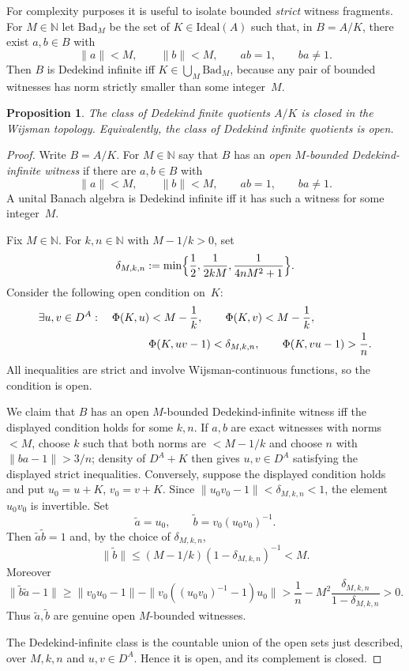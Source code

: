 \documentclass[12pt,fleqn,a4paper]{amsart}
\renewcommand{\le}{\leqslant}
\renewcommand{\ge}{\geqslant}
\numberwithin{equation}{section}
\newtheorem{proposition}[theorem]{Proposition}
\theoremstyle{definition}
\newcommand{\N}{\mathbb{N}}
\newcommand{\Ideal}{\mathrm{Ideal}}
\begin{document}
For complexity purposes it is useful to isolate bounded
\textit{strict} witness fragments.  For $M\in\N$ let $\mathrm{Bad}_M$ be the set of
$K\in\Ideal(A)$ such that, in $B=A/K$, there exist $a,b\in B$ with
\[
        \|a\|<M,\qquad \|b\|<M,\qquad ab=1,\qquad ba\ne 1 .
\]
Then $B$ is Dedekind infinite iff $K\in\bigcup_M\mathrm{Bad}_M$, because any pair of
bounded witnesses has norm strictly smaller than some integer~$M$.

\begin{proposition}\label{prop:df-banach}
The class of Dedekind finite quotients $A/K$ is closed in the Wijsman topology.
Equivalently, the class of Dedekind infinite quotients is open.
\end{proposition}

\begin{proof}
Write $B=A/K$.  For $M\in\N$ say that $B$ has an \emph{open $M$-bounded
Dedekind-infinite witness} if there are $a,b\in B$ with
\[
        \|a\|<M,
        \qquad \|b\|<M,
        \qquad ab=1,
        \qquad ba\ne 1 .
\]
A unital Banach algebra is Dedekind infinite iff it has such a witness for some
integer~$M$.

Fix $M\in\N$.  For $k,n\in\N$ with $M-1/k>0$, set
\[
\delta_{M,k,n}:=\min\Bigl\{\frac12,\frac{1}{2kM},\frac{1}{4nM^2+1}\Bigr\}.
\]
Consider the following open condition on~$K$:
\[
\begin{aligned}
&\exists u,v\in D^A:\quad
\Phi(K,u)<M-\frac1k,\qquad
\Phi(K,v)<M-\frac1k,\\
&\hspace{35mm}
\Phi(K,uv-1)<\delta_{M,k,n},\qquad
\Phi(K,vu-1)>\frac1n .
\end{aligned}
\]
All inequalities are strict and involve Wijsman-continuous functions, so the condition
is open.

We claim that $B$ has an open $M$-bounded Dedekind-infinite witness iff the displayed
condition holds for some $k,n$.  If $a,b$ are exact witnesses with norms $<M$, choose
$k$ such that both norms are $<M-1/k$ and choose $n$ with $\|ba-1\|>3/n$; density of
$D^A+K$ then gives $u,v\in D^A$ satisfying the displayed strict inequalities.
Conversely, suppose the displayed condition holds and put $u_0=u+K$, $v_0=v+K$.
Since $\|u_0v_0-1\|<\delta_{M,k,n}<1$, the element $u_0v_0$ is invertible.  Set
\[
        \widetilde a=u_0,
        \qquad
        \widetilde b=v_0(u_0v_0)^{-1}.
\]
Then $\widetilde a\widetilde b=1$ and, by the choice of $\delta_{M,k,n}$,
\[
        \|\widetilde b\|
        \le (M-1/k)(1-\delta_{M,k,n})^{-1}<M .
\]
Moreover
\[
\|\widetilde b\widetilde a-1\|
\ge \|v_0u_0-1\|-
     \|v_0((u_0v_0)^{-1}-1)u_0\|
> \frac1n- M^2\frac{\delta_{M,k,n}}{1-\delta_{M,k,n}}>0.
\]
Thus $\widetilde a,\widetilde b$ are genuine open $M$-bounded witnesses.

The Dedekind-infinite class is the countable union of the open sets just described,
over $M,k,n$ and $u,v\in D^A$.  Hence it is open, and its complement is closed.
\end{proof}
\end{document}
